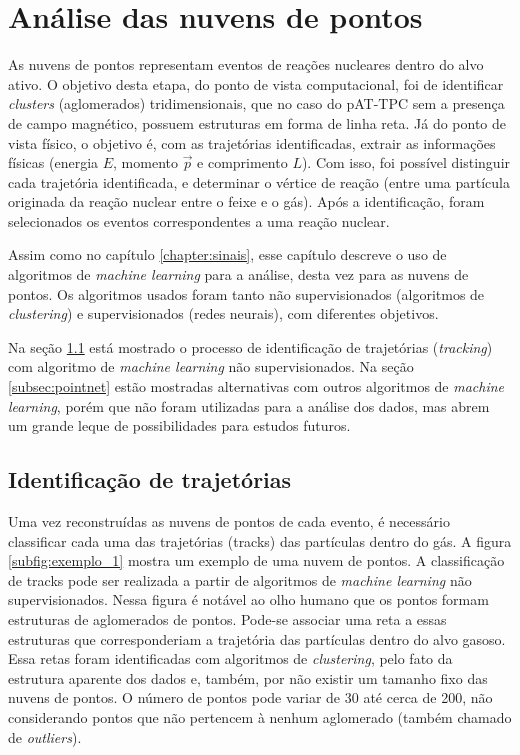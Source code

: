 \documentclass[a4paper,12pt,oneside]{book}
\begin{document}
\chapter{Análise das nuvens de pontos}\label{chapter:point_cloud_analysis}

\par As nuvens de pontos representam eventos de reações nucleares dentro do alvo ativo. O objetivo desta etapa, do ponto de vista computacional, foi de identificar \textit{clusters} (aglomerados) tridimensionais, que no caso do pAT-TPC sem a presença de campo magnético, possuem estruturas em forma de linha reta. Já do ponto de vista físico, o objetivo é, com as trajetórias identificadas, extrair as informações físicas (energia $E$, momento $\vec{p}$ e comprimento $L$). Com isso, foi possível distinguir cada trajetória identificada, e determinar o vértice de reação (entre uma partícula originada da reação nuclear entre o feixe e o gás). Após a identificação, foram selecionados os eventos correspondentes a uma reação nuclear.

\par Assim como no capítulo \ref{chapter:sinais}, esse capítulo descreve o uso de algoritmos de \textit{machine learning} para a análise, desta vez para as nuvens de pontos. Os algoritmos usados foram tanto não supervisionados (algoritmos de \textit{clustering}) e supervisionados (redes neurais), com diferentes objetivos.

\par Na seção \ref{sec:forcabruta} está mostrado o processo de identificação de trajetórias (\textit{tracking}) com algoritmo de \textit{machine learning} não supervisionados. Na seção \ref{subsec:pointnet} estão mostradas alternativas com outros algoritmos de \textit{machine learning}, porém que não foram utilizadas para a análise dos dados, mas abrem um grande leque de possibilidades para estudos futuros.



\section{Identificação de trajetórias}\label{sec:forcabruta}

\par Uma vez reconstruídas as nuvens de pontos de cada evento, é necessário classificar cada uma das trajetórias (tracks) das partículas dentro do gás. A figura \ref{subfig:exemplo_1} mostra um exemplo de uma nuvem de pontos. A classificação de tracks pode ser realizada a partir de algoritmos de \textit{machine learning} não supervisionados. Nessa figura é notável ao olho humano que os pontos formam estruturas de aglomerados de pontos. Pode-se associar uma reta a essas estruturas que corresponderiam a trajetória das partículas dentro do alvo gasoso. Essa retas foram identificadas com algoritmos de \textit{clustering}, pelo fato da estrutura aparente dos dados e, também, por não existir um tamanho fixo das nuvens de pontos. O número de pontos pode variar de 30 até cerca de 200, não considerando pontos que não pertencem à nenhum aglomerado (também chamado de \textit{outliers}).
\end{document}

